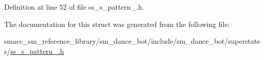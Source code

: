 Definition at line 52 of file ss\+\_\+s\+\_\+pattern\+\_.\+h.



The documentation for this struct was generated from the following file\+:\begin{DoxyCompactItemize}
\item 
smacc\+\_\+sm\+\_\+reference\+\_\+library/sm\+\_\+dance\+\_\+bot/include/sm\+\_\+dance\+\_\+bot/superstates/\hyperlink{ss__s__pattern__1_8h}{ss\+\_\+s\+\_\+pattern\+\_.\+h}\end{DoxyCompactItemize}
